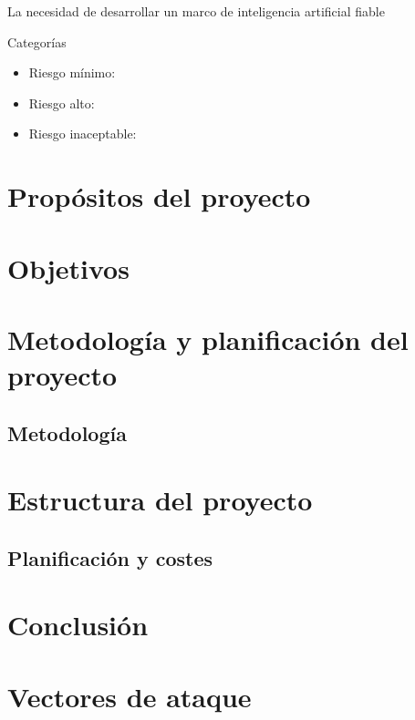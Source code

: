 
La necesidad de desarrollar un marco de inteligencia artificial fiable

Categorías

\begin{itemize}
    \item Riesgo mínimo:
    \item Riesgo alto:
    \item Riesgo inaceptable:
\end{itemize}



\section{Propósitos del proyecto}

\section{Objetivos}

\section{Metodología y planificación del proyecto}

\subsection{Metodología}



\section{Estructura del proyecto}

\subsection{Planificación y costes}

\section{Conclusión}






\section{Vectores de ataque}

